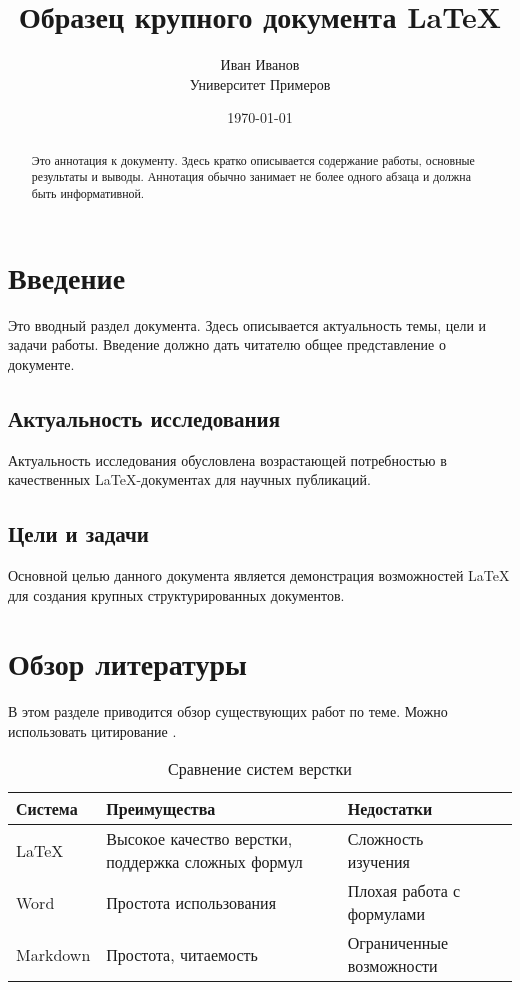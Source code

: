 \documentclass[a4paper,12pt]{article}
\begin{document}
\title{Образец крупного документа LaTeX}
\author{Иван Иванов \\ Университет Примеров}
\date{\today}
\maketitle

\begin{abstract}
Это аннотация к документу. Здесь кратко описывается содержание работы, основные результаты и выводы. Аннотация обычно занимает не более одного абзаца и должна быть информативной.
\end{abstract}

\tableofcontents

\section{Введение}
\label{sec:intro}

Это вводный раздел документа. Здесь описывается актуальность темы, цели и задачи работы. Введение должно дать читателю общее представление о документе.

\subsection{Актуальность исследования}
Актуальность исследования обусловлена возрастающей потребностью в качественных LaTeX-документах для научных публикаций.

\subsection{Цели и задачи}
Основной целью данного документа является демонстрация возможностей LaTeX для создания крупных структурированных документов.

\section{Обзор литературы}
\label{sec:literature}

В этом разделе приводится обзор существующих работ по теме. Можно использовать цитирование \cite{lamport94}.

\begin{table}[h]
\centering
\caption{Сравнение систем верстки}
\label{tab:comparison}
\begin{tabularx}{\linewidth}{lXXX}
\toprule
Система & Преимущества & Недостатки \\
\midrule
LaTeX & Высокое качество верстки, поддержка сложных формул & Сложность изучения \\
Word & Простота использования & Плохая работа с формулами \\
Markdown & Простота, читаемость & Ограниченные возможности \\
\bottomrule
\end{tabularx}
\end{table}
\end{document}
